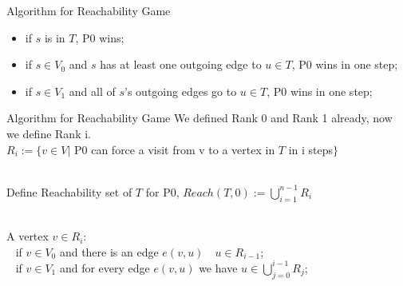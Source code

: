 \begin{frame}{Algorithm for Reachability Game}
\begin{figure}
    \centering
    \begin{adjustbox}{width=0.3\textwidth}
    \end{adjustbox}
\end{figure}
    \begin{itemize}
        \item if $s$ is in $T$, P0 wins;
        \item if $s\in V_0$ and $s$ has at least one outgoing edge to $u\in T$, P0 wins in one step;
        \item if $s\in V_1$ and all of $s$'s outgoing edges go to $u\in T$, P0 wins in one step;
    \end{itemize}
\end{frame}
\begin{frame}{Algorithm for Reachability Game}
    We defined Rank 0 and Rank 1 already, now we define Rank i.\\
    
    $R_i:=\{v\in V|$ P0 can force a visit from v to a vertex in $T$ in i steps$\}$\\~
    
    Define Reachability set of $T$ for P0, $Reach(T,0) := \bigcup_{i=1}^{n-1}R_i$\\~
    
    
        A vertex $v\in R_i$: \\~
            if $v \in V_0$ and there is an edge $e(v,u)\quad u\in R_{i-1}$;\\~
            if $v \in V_1$ and for every edge $e(v,u)$ we have $u\in \bigcup_{j=0}^{i-1} R_j$;\\
        
\end{frame}

